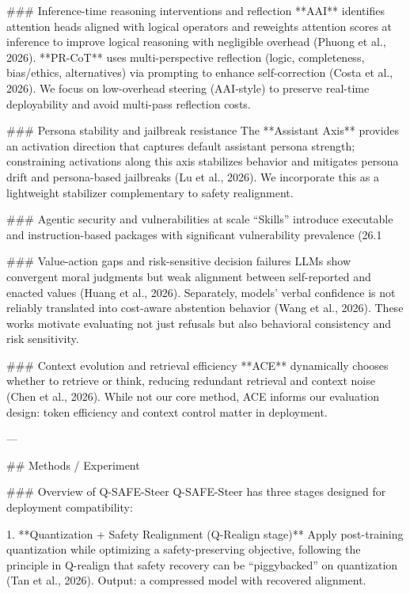 ### Inference-time reasoning interventions and reflection  
**AAI** identifies attention heads aligned with logical operators and reweights attention scores at inference to improve logical reasoning with negligible overhead (Phuong et al., 2026). **PR-CoT** uses multi-perspective reflection (logic, completeness, bias/ethics, alternatives) via prompting to enhance self-correction (Costa et al., 2026). We focus on low-overhead steering (AAI-style) to preserve real-time deployability and avoid multi-pass reflection costs.

### Persona stability and jailbreak resistance  
The **Assistant Axis** provides an activation direction that captures default assistant persona strength; constraining activations along this axis stabilizes behavior and mitigates persona drift and persona-based jailbreaks (Lu et al., 2026). We incorporate this as a lightweight stabilizer complementary to safety realignment.

### Agentic security and vulnerabilities at scale  
“Skills” introduce executable and instruction-based packages with significant vulnerability prevalence (26.1%

### Value-action gaps and risk-sensitive decision failures  
LLMs show convergent moral judgments but weak alignment between self-reported and enacted values (Huang et al., 2026). Separately, models’ verbal confidence is not reliably translated into cost-aware abstention behavior (Wang et al., 2026). These works motivate evaluating not just refusals but also behavioral consistency and risk sensitivity.

### Context evolution and retrieval efficiency  
**ACE** dynamically chooses whether to retrieve or think, reducing redundant retrieval and context noise (Chen et al., 2026). While not our core method, ACE informs our evaluation design: token efficiency and context control matter in deployment.

---

## Methods / Experiment  

### Overview of Q-SAFE-Steer  
Q-SAFE-Steer has three stages designed for deployment compatibility:

1. **Quantization + Safety Realignment (Q-Realign stage)**  
   Apply post-training quantization while optimizing a safety-preserving objective, following the principle in Q-realign that safety recovery can be “piggybacked” on quantization (Tan et al., 2026). Output: a compressed model with recovered alignment.


